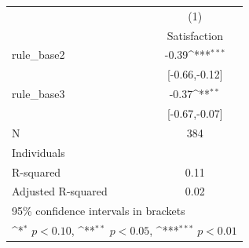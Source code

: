 {
\def\sym#1{\ifmmode^{#1}\else\(^{#1}\)\fi}
\begin{tabular}{l*{1}{c}}
\toprule
            &\multicolumn{1}{c}{(1)}        \\
            &\multicolumn{1}{c}{Satisfaction}\\
\midrule
rule\_base2  &                 -0.39\sym{***}\\
            &         [-0.66,-0.12]         \\
\addlinespace
rule\_base3  &                 -0.37\sym{**} \\
            &         [-0.67,-0.07]         \\
\midrule
N           &                   384         \\
Individuals &                               \\
R-squared   &                  0.11         \\
Adjusted R-squared&                  0.02         \\
\bottomrule
\multicolumn{2}{l}{\footnotesize 95\% confidence intervals in brackets}\\
\multicolumn{2}{l}{\footnotesize \sym{*} \(p<0.10\), \sym{**} \(p<0.05\), \sym{***} \(p<0.01\)}\\
\end{tabular}
}
